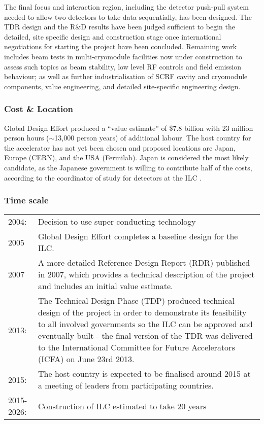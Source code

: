 The final focus and interaction region, including the detector push-pull system needed to allow two detectors to take data sequentially, has been designed. The TDR design and the R\&D results have been judged sufficient to begin the detailed, site specific design and construction stage once international negotiations for starting the project have been concluded. Remaining work includes beam tests in multi-cryomodule facilities now under construction to assess such topics as beam stability, low level RF controls and field emission behaviour; as well as further industrialisation of SCRF cavity and cryomodule components, value engineering, and detailed site-specific engineering design. \cite{ILC:OtherReport}
 
\subsubsection{Cost \& Location}


Global Design Effort produced a “value estimate” of \$7.8 billion with 23 million person hours ($\sim$13,000 person years) of additional labour.
The host country for the accelerator has not yet been chosen and proposed locations are Japan, Europe (CERN), and the USA (Fermilab). Japan is considered the most likely candidate, as the Japanese government is willing to contribute half of the costs, according to the coordinator of study for detectors at the ILC .
 
\subsubsection{Time scale}

\begin{tabular}{p{2cm} p{12.5cm}}

2004: & Decision to use super conducting technology \\
2005 & Global Design Effort completes a baseline design for the ILC. \\
2007 & A more detailed Reference Design Report (RDR) published in 2007, which provides a technical description of the project and includes an initial value estimate. \\
2013: & The Technical Design Phase (TDP) produced technical design of the project in order to demonstrate its feasibility to all involved governments so the ILC can be approved and eventually built - the final version of the TDR was delivered to the International Committee for Future Accelerators (ICFA) on June 23rd 2013. \\
2015: & The host country is expected to be finalised around 2015 at a meeting of leaders from participating countries. \\
2015-2026: & Construction of ILC estimated to take 20 years \\

\end{tabular}
